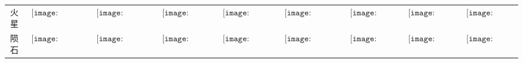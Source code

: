\begin{longtable}{|c|cccccccc|}
火星&$\begin{array}{c}\texttt{[image: figures/Martian\_Hover\_Candle.png]}\end{array}$&$\begin{array}{c}\texttt{[image: figures/Martian\_Table\_Lamp.png]}\end{array}$&$\begin{array}{c}\texttt{[image: figures/Martian\_Lamppost.png]}\end{array}$&$\begin{array}{c}\texttt{[image: figures/Martian\_Lantern.png]}\end{array}$&$\begin{array}{c}\texttt{[image: figures/Martian\_Chandelier.png]}\end{array}$&$\begin{array}{c}\texttt{[image: figures/Martian\_Door.png]}\end{array}$&$\begin{array}{c}\texttt{[image: figures/Martian\_Toilet.png]}\end{array}$&$\begin{array}{c}\texttt{[image: figures/Martian\_Chest.png]}\end{array}$\\
陨石&$\begin{array}{c}\texttt{[image: figures/Meteorite\_Candle.png]}\end{array}$&$\begin{array}{c}\texttt{[image: figures/Meteorite\_Candelabra.png]}\end{array}$&$\begin{array}{c}\texttt{[image: figures/Meteorite\_Lamp.png]}\end{array}$&$\begin{array}{c}\texttt{[image: figures/Meteorite\_Lantern.png]}\end{array}$&$\begin{array}{c}\texttt{[image: figures/Meteorite\_Chandelier.png]}\end{array}$&$\begin{array}{c}\texttt{[image: figures/Meteorite\_Door.png]}\end{array}$&$\begin{array}{c}\texttt{[image: figures/Meteor\_Toilet.png]}\end{array}$&$\begin{array}{c}\texttt{[image: figures/Meteorite\_Chest.png]}\end{array}$\\

\end{longtable}

